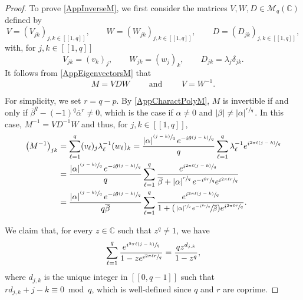 \documentclass[10pt]{article}
\newcommand{\psfrac}[2]{\sfrac{(#1)}{#2}}
\newcommand{\Psfrac}[2]{(\sfrac{#1}{#2})}
\newcommand{\llbracket}{[\![}
\newcommand{\rrbracket}{]\!]}
\theoremstyle{plain}
\theoremstyle{definition}
\newcommand{\abs}[1]{\left\lvert #1\right \rvert}
\numberwithin{equation}{section}\numberwithin{figure}{section}\emergencystretch=3em
\begin{document}
\begin{proof}
To prove \eqref{AppInverseM}, we first consider the matrices $V, W, D \in \mathcal M_{q}(\mathbb C)$ defined by
\[
V = (V_{jk})_{j, k \in \llbracket 1, q\rrbracket}, \qquad W = (W_{jk})_{j, k \in \llbracket 1, q\rrbracket}, \qquad D = (D_{jk})_{j, k \in \llbracket 1, q\rrbracket},
\]
with, for $j, k \in \llbracket 1, q\rrbracket$
\[
V_{jk} = (v_k)_j, \qquad W_{jk} = (w_j)_k, \qquad D_{jk} = \lambda_j \delta_{jk}.
\]
It follows from \eqref{AppEigenvectorsM} that
\[
M = V D W \qquad \text{ and } \qquad V = W^{-1}.
\]

For simplicity, we set $r\!=\!q - p$. By \eqref{AppCharactPolyM}, $M$ is invertible if and only if \hbox{$\overline\beta^q\!-\!(-1)^q \overline\alpha^r\!\neq\!0$}, which is the case if $\alpha \neq 0$ and $\abs{\beta} \neq \abs{\alpha}^{\sfrac{r}{q}}$. In this case, $M^{-1} = V D^{-1} W$ and thus, for $j, k \in \llbracket 1, q\rrbracket$,
\begin{equation}
\label{DevelopMMinus1}
\begin{aligned}
\left(M^{-1}\right)_{jk} & = \sum_{\ell=1}^q (v_\ell)_j \lambda_\ell^{-1} (w_\ell)_k = \frac{\abs{\alpha}^{\psfrac{j-k}{q}} e^{-i\theta\psfrac{j-k}{q}}}{q} \sum_{\ell=1}^q \lambda_\ell^{-1} e^{i \sfrac{2\pi \ell (j - k)}{q}}\\
& = \frac{\abs{\alpha}^{\psfrac{j-k}{q}} e^{-i\theta\psfrac{j-k}{q}}}{q} \sum_{\ell=1}^q \frac{e^{i \sfrac{2\pi \ell (j - k)}{q}}}{\overline\beta + \abs{\alpha}^{\sfrac{r}{q}} e^{-i\sfrac{\theta r}{q}} e^{i \sfrac{2\pi \ell r}{q}}}\\
&= \frac{\abs{\alpha}^{\psfrac{j-k}{q}} e^{-i\theta\psfrac{j-k}{q}}}{q \overline\beta} \sum_{\ell=1}^q \frac{e^{i \sfrac{2\pi \ell (j - k)}{q}}}{1 + \Psfrac{\abs{\alpha}^{\sfrac{r}{q}} e^{-i\sfrac{\theta r}{q}}}{\overline\beta} e^{i \sfrac{2\pi \ell r}{q}}}.
\end{aligned}
\end{equation}

We claim that, for every $z \in \mathbb C$ such that $z^q \neq 1$, we have
\begin{equation}
\label{CalculSommeMeromorphe}
\sum_{\ell=1}^q \frac{e^{i \sfrac{2\pi \ell (j - k)}{q}}}{1 - z e^{i \sfrac{2 \pi \ell r}{q}}} = \frac{q z^{d_{j, k}}}{1 - z^q},
\end{equation}
where $d_{j, k}$ is the unique integer in $\llbracket 0, q-1\rrbracket$ such that $r d_{j, k} + j - k \equiv 0 \bmod q$, which is well-defined since $q$ and $r$ are coprime.


\end{proof}
\end{document}
